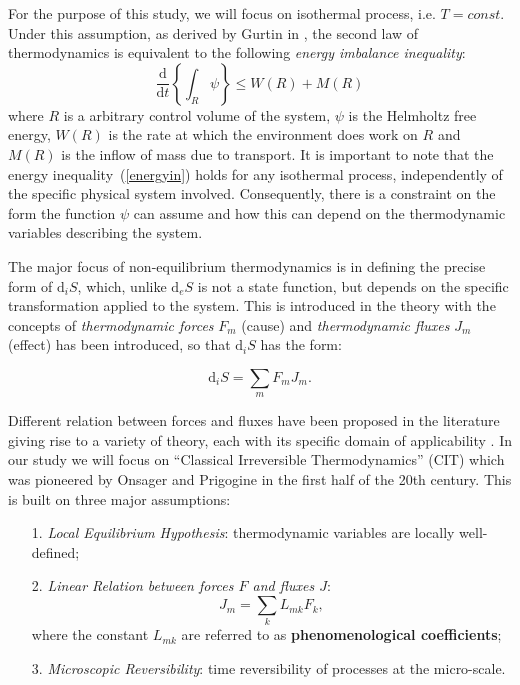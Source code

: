 \documentclass[runningheads]{llncs}
\renewcommand{\d}{\ensuremath{\text{d}}}
\begin{document}
For the purpose of this study, we will focus on isothermal process, i.e. $T=const$. Under this assumption, as derived by Gurtin in \cite{GURTIN}, the second law of thermodynamics is equivalent to the following \textit{energy imbalance inequality}:
\begin{equation}
\frac{\d}{\d t} \left\{\int_R \psi \right\}\leq W(R) + M(R) \label{energyin}
\end{equation}
where $R$ is a arbitrary control volume of the system, $\psi$ is the Helmholtz free energy, $W(R)$ is the rate at which the environment does work on $R$ and $M(R)$ is the inflow of mass due to transport. It is important to note that the energy inequality~(\ref{energyin}) holds for any isothermal process, independently of the specific physical system involved. Consequently, there is a constraint on the form the function $\psi$ can assume and how this can depend on the thermodynamic variables describing the system. 

The major focus of non-equilibrium thermodynamics is in defining the precise form of $\d_i S$, which, unlike $\d_e S$ is not a state function, but depends on the specific transformation applied to the system. This is introduced in the theory with the concepts of \textit{thermodynamic forces} $F_m$ (cause) and \textit{thermodynamic fluxes} $J_m$ (effect) has been introduced, so that $\d_iS$ has the form:

\begin{equation}
\d_iS = \sum_m F_m J_m.
\label{2law}
\end{equation}

Different relation between forces and fluxes have been proposed in the literature giving rise to a variety of theory, each with its specific domain of applicability \cite{NET}. In our study we will focus on \textquotedblleft Classical Irreversible Thermodynamics'' (CIT) which was pioneered by Onsager \cite{onsager} and Prigogine \cite{prigogine} in the first half of the 20th century. This is built on three major assumptions:
\begin{itemize}
	\item[1.] \textit{Local Equilibrium Hypothesis}: thermodynamic variables are locally well-defined;
	\item[2.] \textit{Linear Relation between forces $F$ and fluxes $J$}:
	\begin{equation}
	J_m = \sum_k L_{mk} F_k,\label{lin}
	\end{equation}
	where the constant $L_{mk}$ are referred to as \textbf{phenomenological coefficients};
	\item[3.] \textit{Microscopic Reversibility}: time reversibility of processes at the micro-scale. 
\end{itemize}
\end{document}

